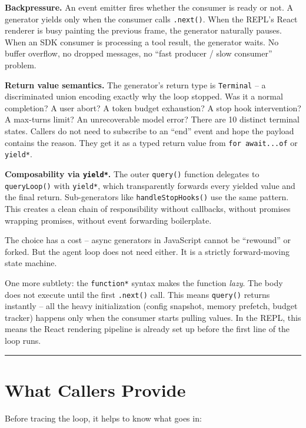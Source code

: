 \documentclass[
  english,
  11pt,
  letterpaper,
]{book}
\begin{document}
\textbf{Backpressure.} An event emitter fires whether the consumer is
ready or not. A generator yields only when the consumer calls
\texttt{.next()}. When the REPL's React renderer is busy painting the
previous frame, the generator naturally pauses. When an SDK consumer is
processing a tool result, the generator waits. No buffer overflow, no
dropped messages, no ``fast producer / slow consumer'' problem.

\textbf{Return value semantics.} The generator's return type is
\texttt{Terminal} -- a discriminated union encoding exactly why the loop
stopped. Was it a normal completion? A user abort? A token budget
exhaustion? A stop hook intervention? A max-turns limit? An
unrecoverable model error? There are 10 distinct terminal states.
Callers do not need to subscribe to an ``end'' event and hope the
payload contains the reason. They get it as a typed return value from
\texttt{for\ await...of} or \texttt{yield*}.

\textbf{Composability via \texttt{yield*}.} The outer \texttt{query()}
function delegates to \texttt{queryLoop()} with \texttt{yield*}, which
transparently forwards every yielded value and the final return.
Sub-generators like \texttt{handleStopHooks()} use the same pattern.
This creates a clean chain of responsibility without callbacks, without
promises wrapping promises, without event forwarding boilerplate.

The choice has a cost -- async generators in JavaScript cannot be
``rewound'' or forked. But the agent loop does not need either. It is a
strictly forward-moving state machine.

One more subtlety: the \texttt{function*} syntax makes the function
\emph{lazy}. The body does not execute until the first \texttt{.next()}
call. This means \texttt{query()} returns instantly -- all the heavy
initialization (config snapshot, memory prefetch, budget tracker)
happens only when the consumer starts pulling values. In the REPL, this
means the React rendering pipeline is already set up before the first
line of the loop runs.

\begin{center}\rule{0.5\linewidth}{0.5pt}\end{center}

\section{What Callers Provide}\label{what-callers-provide}

Before tracing the loop, it helps to know what goes in:
\end{document}

